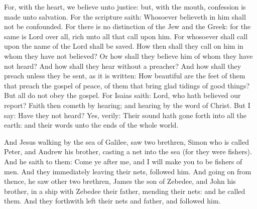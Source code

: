 For, with the heart, we believe unto justice: but, with the
mouth, confession is made unto salvation.
For the scripture saith: Whosoever believeth in him shall not be
confounded.
For there is no distinction of the Jew and the Greek: for the
same is Lord over all, rich unto all that call upon him.
For whosoever shall call upon the name of the Lord shall be
saved.
How then shall they call on him in whom they have not believed?
Or how shall they believe him of whom they have not heard? And how shall
they hear without a preacher?
And how shall they preach unless they be sent, as it is written:
How beautiful are the feet of them that preach the gospel of peace, of
them that bring glad tidings of good things?
But all do not obey the gospel. For Isaias saith: Lord, who hath
believed our report?
Faith then cometh by hearing; and hearing by the word of Christ.
But I say: Have they not heard? Yes, verily: Their sound hath
gone forth into all the earth: and their words unto the ends of the
whole world.

\goodbreak


And Jesus walking by the sea of Galilee, saw two brethren, Simon
who is called Peter, and Andrew his brother, casting a net into the sea
(for they were fishers).
And he saith to them: Come ye after me, and I will make you to be
fishers of men.
And they immediately leaving their nets, followed him.
And going on from thence, he saw other two brethren, James the son
of Zebedee, and John his brother, in a ship with Zebedee their father,
mending their nets: and he called them.
And they forthwith left their nets and father, and followed him.


